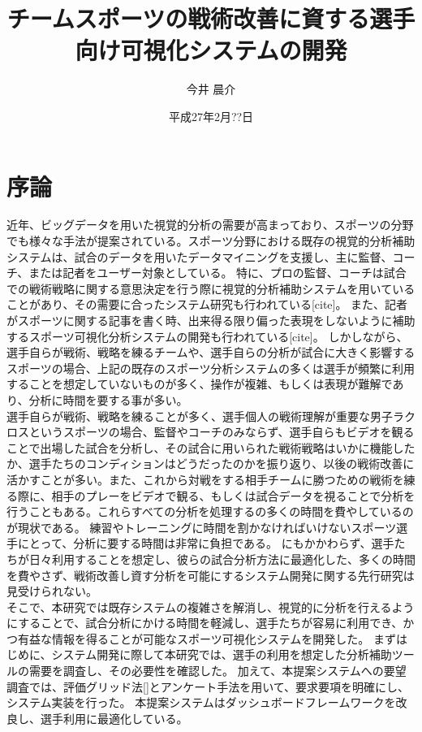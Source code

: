 \documentclass[sotsuron]{kuee}
\title{チームスポーツの戦術改善に資する選手向け可視化システムの開発}
\author{今井 晨介}
\date{平成27年2月??日}
\begin{document}
\maketitle	
\tableofcontents

\chapter{序論}
近年、ビッグデータを用いた視覚的分析の需要が高まっており、スポーツの分野でも様々な手法が提案されている。スポーツ分野における既存の視覚的分析補助システムは、試合のデータを用いたデータマイニングを支援し、主に監督、コーチ、または記者をユーザー対象としている。
特に、プロの監督、コーチは試合での戦術戦略に関する意思決定を行う際に視覚的分析補助システムを用いていることがあり、その需要に合ったシステム研究も行われている[cite]。
また、記者がスポーツに関する記事を書く時、出来得る限り偏った表現をしないように補助するスポーツ可視化分析システムの開発も行われている[cite]。
しかしながら、選手自らが戦術、戦略を練るチームや、選手自らの分析が試合に大きく影響するスポーツの場合、上記の既存のスポーツ分析システムの多くは選手が頻繁に利用することを想定していないものが多く、操作が複雑、もしくは表現が難解であり、分析に時間を要する事が多い。
\\選手自らが戦術、戦略を練ることが多く、選手個人の戦術理解が重要な男子ラクロスというスポーツの場合、監督やコーチのみならず、選手自らもビデオを観ることで出場した試合を分析し、その試合に用いられた戦術戦略はいかに機能したか、選手たちのコンディションはどうだったのかを振り返り、以後の戦術改善に活かすことが多い。また、これから対戦をする相手チームに勝つための戦術を練る際に、相手のプレーをビデオで観る、もしくは試合データを視ることで分析を行うこともある。これらすべての分析を処理するの多くの時間を費やしているのが現状である。
練習やトレーニングに時間を割かなければいけないスポーツ選手にとって、分析に要する時間は非常に負担である。
にもかかわらず、選手たちが日々利用することを想定し、彼らの試合分析方法に最適化した、多くの時間を費やさず、戦術改善し資す分析を可能にするシステム開発に関する先行研究は見受けられない。
\\そこで、本研究では既存システムの複雑さを解消し、視覚的に分析を行えるようにすることで、試合分析にかける時間を軽減し、選手たちが容易に利用でき、かつ有益な情報を得ることが可能なスポーツ可視化システムを開発した。
まずはじめに、システム開発に際して本研究では、選手の利用を想定した分析補助ツールの需要を調査し、その必要性を確認した。
加えて、本提案システムへの要望調査では、評価グリッド法[]とアンケート手法を用いて、要求要項を明確にし、システム実装を行った。
本提案システムはダッシュボードフレームワークを改良し、選手利用に最適化している。
\end{document}
